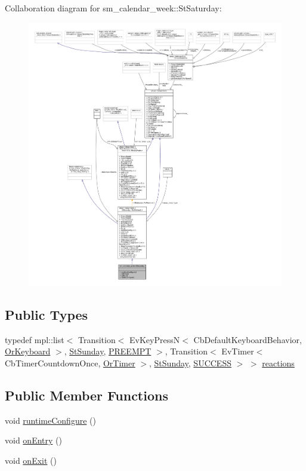 Collaboration diagram for sm\+\_\+calendar\+\_\+week\+:\+:St\+Saturday\+:
\nopagebreak
\begin{figure}[H]
\begin{center}
\leavevmode
\includegraphics[width=350pt]{structsm__calendar__week_1_1StSaturday__coll__graph}
\end{center}
\end{figure}
\subsection*{Public Types}
\begin{DoxyCompactItemize}
\item 
typedef mpl\+::list$<$ Transition$<$ Ev\+Key\+PressN$<$ Cb\+Default\+Keyboard\+Behavior, \hyperlink{classsm__calendar__week_1_1OrKeyboard}{Or\+Keyboard} $>$, \hyperlink{structsm__calendar__week_1_1StSunday}{St\+Sunday}, \hyperlink{classPREEMPT}{P\+R\+E\+E\+M\+PT} $>$, Transition$<$ Ev\+Timer$<$ Cb\+Timer\+Countdown\+Once, \hyperlink{classsm__calendar__week_1_1OrTimer}{Or\+Timer} $>$, \hyperlink{structsm__calendar__week_1_1StSunday}{St\+Sunday}, \hyperlink{classSUCCESS}{S\+U\+C\+C\+E\+SS} $>$ $>$ \hyperlink{structsm__calendar__week_1_1StSaturday_a8c581c22cf6a32adec475c5caadd4b16}{reactions}
\end{DoxyCompactItemize}
\subsection*{Public Member Functions}
\begin{DoxyCompactItemize}
\item 
void \hyperlink{structsm__calendar__week_1_1StSaturday_a3552be67b39ddaec030b7efc8909741b}{runtime\+Configure} ()
\item 
void \hyperlink{structsm__calendar__week_1_1StSaturday_ace848e747636e7b5b85389d7a9447e77}{on\+Entry} ()
\item 
void \hyperlink{structsm__calendar__week_1_1StSaturday_a50d9bc3a2993a9bf7a5725b9c6019728}{on\+Exit} ()
\end{DoxyCompactItemize}
